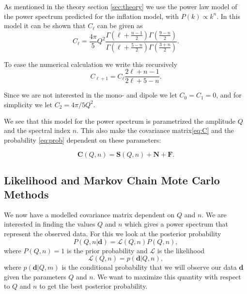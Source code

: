 \documentclass{emulateapj}
\begin{document}
As mentioned in the theory section \ref{sec:theory} we use the power law model of the power spectrum predicted for the inflation model, with $P(k) \propto k^n$. In this model it can be shown\citep{bond} that $C_\ell$ can be given as
\begin{equation}
C_\ell = \frac{4\pi}{5}Q^2\frac{\Gamma\left(\ell + \frac{n-1}{2}\right)\Gamma\left(\frac{9-n}{2}\right)}{\Gamma\left(\ell + \frac{5-n}{2}\right)\Gamma\left(\frac{3+n}{2}\right)}.
\end{equation}

To ease the numerical calculation we write this recursively
\begin{equation}
C_{\ell + 1} = C_\ell \frac{2\ell + n -1}{2\ell + 5 - n}.
\end{equation}

Since we are not interested in the mono- and dipole we let $C_0 = C_1 = 0$, and for simplicity we let $C_2 = 4\pi/5Q^2$.

We see that this model for the power spectrum is parametrized the amplitude $Q$ and the spectral index $n$. This also make the covariance matrix\eqref{eq:C} and the probability \eqref{eq:prob} dependent on these parameters:

\begin{equation}
\mathbf{C}(Q,n) = \mathbf{S}(Q,n) + \mathbf{N} + \mathbf{F}.
\label{eq:C(Q,n)}
\end{equation}

\subsection{Likelihood and Markov Chain Mote Carlo Methods}
We now have a modelled covariance matrix dependent on $Q$ and $n$. We are interested in finding the values $Q$ and $n$ which gives a power spectrum that represent the observed data. For this we look at the posterior probability
\begin{equation}
P(Q,n|\mathbf{d}) = \mathcal{L}(Q,n)P(Q,n),
\end{equation}
where $P(Q,n) = 1$ is the prior probability and $\mathcal{L}$ is the likelihood
\begin{equation}
\mathcal{L}(Q,n) = p(\mathbf{d}|Q,n),
\end{equation}
where $p(\mathbf{d}|Q,m)$ is the conditional probability that we will observe our data $\mathbf{d}$ given the parameters $Q$ and $n$. We want to maximize this quantity with respect to $Q$ and $n$ to get the best posterior probability.
\end{document}
